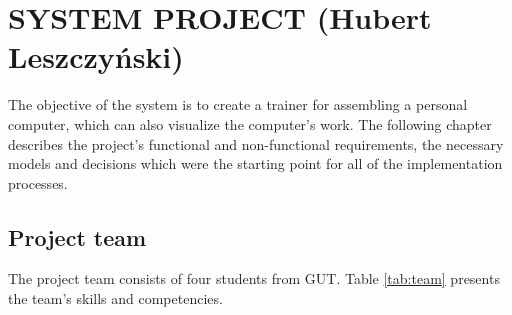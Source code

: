 \chapter{SYSTEM PROJECT (Hubert Leszczyński)}
\label{chap:project}

The objective of the system is to create a trainer for assembling a personal computer, which can also visualize the computer's work.
The following chapter describes the project's functional and non-functional requirements, the necessary models and decisions which were the starting point for all of the implementation processes.

\section{Project team}

The project team consists of four students from GUT.
Table \ref{tab:team} presents the team's skills and competencies.

